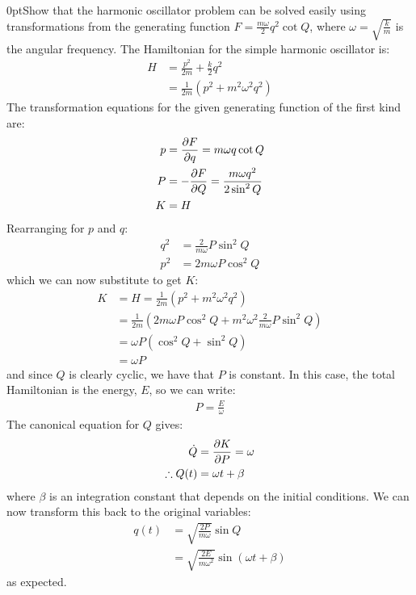 \begin{example}{0pt}{Show that the harmonic oscillator problem can be solved easily using transformations from the generating function $F=\frac{m\omega}{2}q^2\cot Q$, where $\omega=\sqrt{\frac{k}{m}}$ is the angular frequency.}{}
The Hamiltonian for the simple harmonic oscillator is:
\begin{align*}
H&=\frac{p^2}{2m}+\frac{k}{2}q^2\\
&=\frac{1}{2m}(p^2+m^2\omega^2q^2)
\end{align*}
The transformation equations for the given generating function of the first kind are:
\begin{align*}
p&=\frac{\partial F}{\partial q}=m\omega q\cot Q \\
P&=-\frac{\partial F}{\partial Q}=\frac{m\omega q^2}{2\sin^2 Q}\\
K&=H
\end{align*}
Rearranging for $p$ and $q$:
\begin{align*}
q^2&=\frac{2}{m\omega}P\sin^2Q\\
p^2&=2m\omega P\cos^2Q
\end{align*}
which we can now substitute to get $K$:
\begin{align*}
K&=H=\frac{1}{2m}(p^2+m^2\omega^2q^2)\\
&=\frac{1}{2m}\left(2m\omega P\cos^2Q +m^2\omega^2\frac{2}{m\omega}P\sin^2Q  \right)\\
&=\omega P(\cos^2Q+\sin^2Q)\\
&=\omega P
\end{align*}
and since $Q$ is clearly cyclic, we have that $P$ is constant. In this case, the total Hamiltonian is the energy, $E$, so we can write:
\begin{align*}
P=\frac{E}{\omega}
\end{align*}
The canonical equation for $Q$ gives:
\begin{align*}
\dot Q&=\frac{\partial K}{\partial P}=\omega\\
\therefore Q(t)&=\omega t +\beta
\end{align*}
where $\beta$ is an integration constant that depends on the initial conditions. We can now transform this back to the original variables:
\begin{align*}
q(t)&=\sqrt{\frac{2P}{m\omega}}\sin Q\\
&=\sqrt{\frac{2E}{m\omega^2}}\sin(\omega t +\beta)
\end{align*}
as expected.

\end{example}

